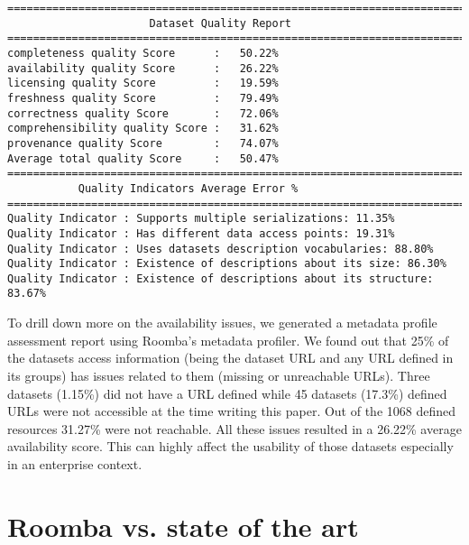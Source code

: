 \begin{lstlisting}
========================================================================
                      Dataset Quality Report
========================================================================
completeness quality Score      :   50.22%
availability quality Score      :   26.22%
licensing quality Score         :   19.59%
freshness quality Score         :   79.49%
correctness quality Score       :   72.06%
comprehensibility quality Score :   31.62%
provenance quality Score        :   74.07%
Average total quality Score     :   50.47%
========================================================================
           Quality Indicators Average Error %
========================================================================
Quality Indicator : Supports multiple serializations: 11.35%
Quality Indicator : Has different data access points: 19.31%
Quality Indicator : Uses datasets description vocabularies: 88.80%
Quality Indicator : Existence of descriptions about its size: 86.30%
Quality Indicator : Existence of descriptions about its structure: 83.67%
\end{lstlisting}

To drill down more on the availability issues, we generated a metadata profile assessment report using Roomba's metadata profiler. We found out that 25\% of the datasets access information (being the dataset URL and any URL defined in its groups) has issues related to them (missing or unreachable URLs).
Three datasets (1.15\%) did not have a URL defined while 45 datasets (17.3\%) defined URLs were not accessible at the time writing this paper. Out of the 1068 defined resources 31.27\% were not reachable. All these issues resulted in a 26.22\% average availability score. This can highly affect the usability of those datasets especially in an enterprise context.

\section{Roomba vs. state of the art}

